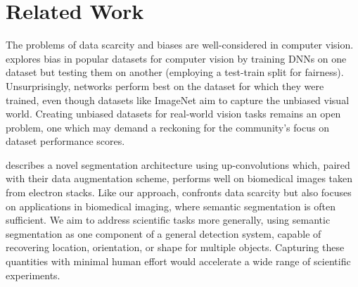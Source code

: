 \documentclass[10pt, journal]{IEEEtran}
\begin{document}
\section{Related Work}
\label{sec:related-work}


The problems of data scarcity and biases are well-considered in computer
vision. \cite{torralba_unbiased_2011} explores bias in popular datasets for
computer vision by training DNNs on one dataset but testing them on another
(employing a test-train split for fairness). Unsurprisingly, networks perform
best on the dataset for which they were trained, even though datasets like
ImageNet aim to capture the unbiased visual world. Creating unbiased datasets
for real-world vision tasks remains an open problem, one which may demand a
reckoning for the community's focus on dataset performance scores.

\cite{ronneberger_u-net:_2015} describes a novel segmentation architecture using
up-convolutions which, paired with their data augmentation scheme, performs well
on biomedical images taken from electron stacks. Like our approach,
\cite{ronneberger_u-net:_2015} confronts data scarcity but also focuses on
applications in biomedical imaging, where semantic segmentation is often
sufficient. We aim to address scientific tasks more generally, using semantic
segmentation as one component of a general detection system, capable of
recovering location, orientation, or shape for multiple objects. Capturing these
quantities with minimal human effort would accelerate a wide range of scientific
experiments.
\end{document}
